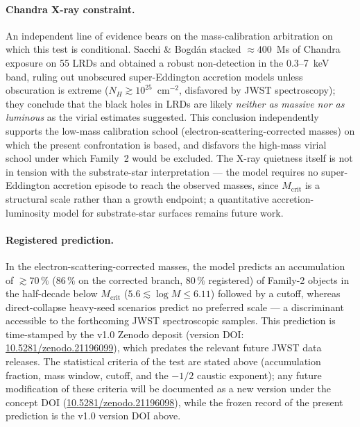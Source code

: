 \documentclass[11pt,a4paper]{article}
\theoremstyle{plain}
\theoremstyle{remark}
\begin{document}
\paragraph{Chandra X-ray constraint.} An independent line of evidence bears on the mass-calibration arbitration on which this test is conditional. Sacchi \& Bogd\'an \cite{sacchi2025} stacked $\approx400$~Ms of Chandra exposure on 55 LRDs and obtained a robust non-detection in the 0.3--7~keV band, ruling out unobscured super-Eddington accretion models unless obscuration is extreme ($N_H \gtrsim 10^{25}$~cm$^{-2}$, disfavored by JWST spectroscopy); they conclude that the black holes in LRDs are likely \emph{neither as massive nor as luminous} as the virial estimates suggested. This conclusion independently supports the low-mass calibration school (electron-scattering-corrected masses) on which the present confrontation is based, and disfavors the high-mass virial school under which Family~2 would be excluded. The X-ray quietness itself is not in tension with the substrate-star interpretation --- the model requires no super-Eddington accretion episode to reach the observed masses, since $M_{\text{crit}}$ is a structural scale rather than a growth endpoint; a quantitative accretion-luminosity model for substrate-star surfaces remains future work.

\paragraph{Registered prediction.} In the electron-scattering-corrected masses, the model predicts an accumulation of $\gtrsim 70\,\%$ ($86\,\%$ on the corrected branch, $80\,\%$ registered) of Family-2 objects in the half-decade below $M_{\text{crit}}$ ($5.6 \lesssim \log M \leq 6.11$) followed by a cutoff, whereas direct-collapse heavy-seed scenarios \cite{jeon2026} predict no preferred scale --- a discriminant accessible to the forthcoming JWST spectroscopic samples. This prediction is time-stamped by the v1.0 Zenodo deposit (version DOI: \href{https://doi.org/10.5281/zenodo.21196099}{10.5281/zenodo.21196099}), which predates the relevant future JWST data releases. The statistical criteria of the test are stated above (accumulation fraction, mass window, cutoff, and the $-1/2$ caustic exponent); any future modification of these criteria will be documented as a new version under the concept DOI (\href{https://doi.org/10.5281/zenodo.21196098}{10.5281/zenodo.21196098}), while the frozen record of the present prediction is the v1.0 version DOI above.
\end{document}

